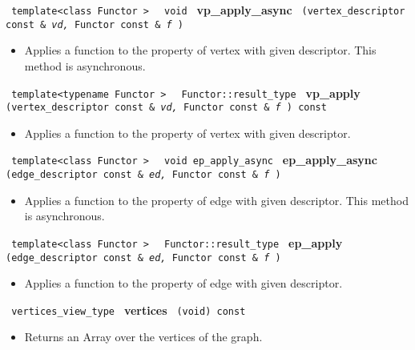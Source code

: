 \noindent
\texttt{%
template<class Functor >
}
\texttt{%
void
}
\newline
\textbf{vp\_apply\_async}%
\texttt{%
(vertex\_descriptor const \&
\textit{vd,}%
Functor const \&
\textit{f}%
)
}

\begin{itemize}
\item
Applies a function to the property of vertex with given descriptor. This method is asynchronous.
\end{itemize}

\noindent
\texttt{%
template<typename Functor >
}
\texttt{%
Functor::result\_type
}
\newline
\textbf{vp\_apply}%
\texttt{%
(vertex\_descriptor const \&
\textit{vd,}%
Functor const \&
\textit{f}%
) const
}

\begin{itemize}
\item
Applies a function to the property of vertex with given descriptor.
\end{itemize}

\noindent
\texttt{%
template<class Functor >
}
\texttt{%
void ep\_apply\_async
}
\newline
\textbf{ep\_apply\_async}%
\texttt{%
(edge\_descriptor const \&
\textit{ed,}%
Functor const \&
\textit{f}%
)
}

\begin{itemize}
\item
Applies a function to the property of edge with given descriptor. This method is asynchronous.
\end{itemize}

\noindent
\texttt{%
template<class Functor >
}
\texttt{%
Functor::result\_type
}
\newline
\textbf{ep\_apply}%
\texttt{%
(edge\_descriptor const \&
\textit{ed,}%
Functor const \&
\textit{f })}%

\begin{itemize}
\item
Applies a function to the property of edge with given descriptor.
\end{itemize}

\noindent
\texttt{%
vertices\_view\_type
}
\newline
\textbf{vertices}%
\texttt{%
(void) const
}

\begin{itemize}
\item
Returns an Array over the vertices of the graph.
\end{itemize}

